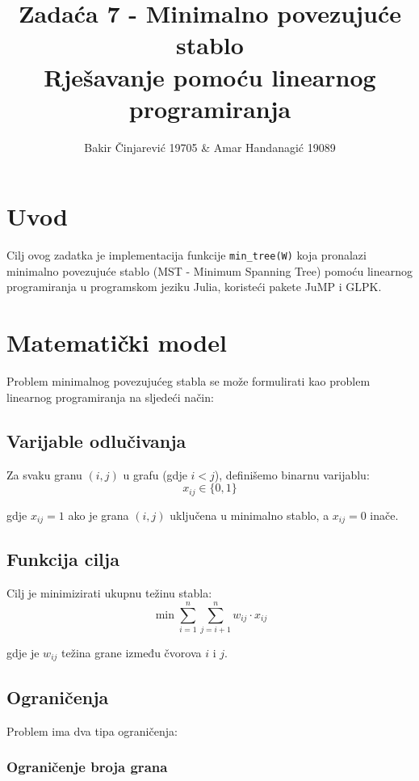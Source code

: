 \documentclass[12pt,a4paper]{article}
\title{\textbf{Zadaća 7 - Minimalno povezujuće stablo} \\ 
\large Rješavanje pomoću linearnog programiranja}
\author{Bakir Činjarević 19705 \& Amar Handanagić 19089}
\date{}
\begin{document}
\maketitle

\section{Uvod}

Cilj ovog zadatka je implementacija funkcije \texttt{min\_tree(W)} koja pronalazi minimalno povezujuće stablo (MST - Minimum Spanning Tree) pomoću linearnog programiranja u programskom jeziku Julia, koristeći pakete JuMP i GLPK.

\section{Matematički model}

Problem minimalnog povezujućeg stabla se može formulirati kao problem linearnog programiranja na sljedeći način:

\subsection{Varijable odlučivanja}

Za svaku granu $(i,j)$ u grafu (gdje $i < j$), definišemo binarnu varijablu:
\begin{equation}
x_{ij} \in \{0, 1\}
\end{equation}

gdje $x_{ij} = 1$ ako je grana $(i,j)$ uključena u minimalno stablo, a $x_{ij} = 0$ inače.

\subsection{Funkcija cilja}

Cilj je minimizirati ukupnu težinu stabla:
\begin{equation}
\min \sum_{i=1}^{n} \sum_{j=i+1}^{n} w_{ij} \cdot x_{ij}
\end{equation}

gdje je $w_{ij}$ težina grane između čvorova $i$ i $j$.

\subsection{Ograničenja}

Problem ima dva tipa ograničenja:

\subsubsection{Ograničenje broja grana}
\end{document}

